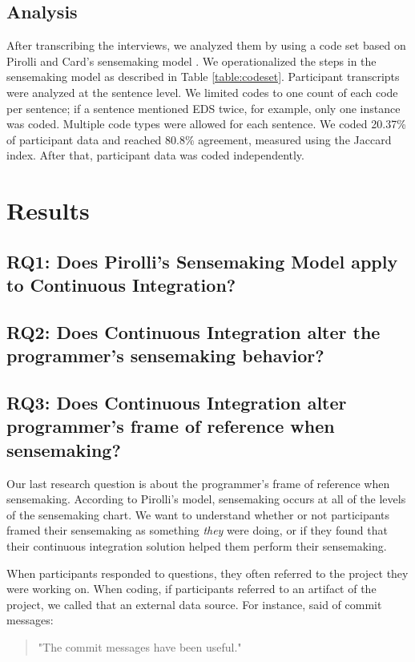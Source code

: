 \documentclass{sig-alternate}
\begin{document}
\subsection{Analysis}
After transcribing the interviews, we analyzed them by using a code set based on Pirolli and Card's sensemaking model \cite{pirolli:sensemaking}. We operationalized the steps in the sensemaking model as described in Table \ref{table:codeset}. Participant transcripts were analyzed at the sentence level. We limited codes to one count of each code per sentence; if a sentence mentioned EDS twice, for example, only one instance was coded. Multiple code types were allowed for each sentence. We coded 20.37\% of participant data and reached 80.8\% agreement, measured using the Jaccard index. After that, participant data was coded independently.

\section{Results}

\subsection{RQ1:  Does Pirolli's Sensemaking Model apply to Continuous Integration?}
\subsection{RQ2: Does Continuous Integration alter the programmer's sensemaking behavior?}
\subsection{RQ3: Does Continuous Integration alter programmer's frame of reference when sensemaking?}
Our last research question is about the programmer's frame of reference when sensemaking. According to Pirolli's model, sensemaking occurs at all of the levels of the sensemaking chart. We want to understand whether or not participants framed their sensemaking as something \textit{they} were doing, or if they found that their continuous integration solution helped them perform their sensemaking.

When participants responded to questions, they often referred to the project they were working on. When coding, if participants referred to an artifact of the project, we called that an external data source. For instance, \srutitwo  said of commit messages: 

\begin{quote}
"The commit messages have been  useful."
\end{quote}
\end{document}
